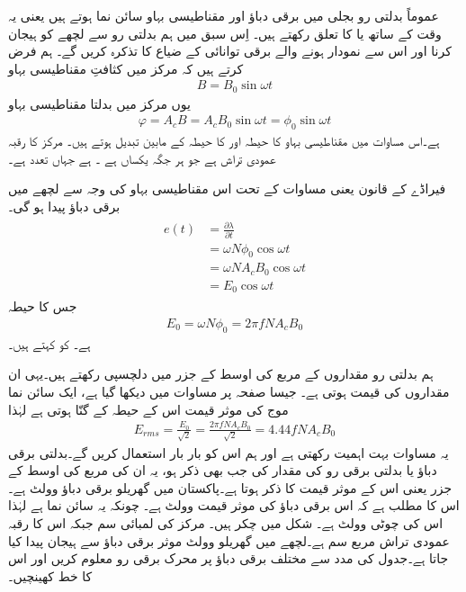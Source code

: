 عموماً بدلتی رو بجلی میں برقی دباؤ اور مقناطیسی بہاو سائن نما ہوتے ہیں یعنی یہ وقت کے ساتھ  یا  کا تعلق رکھتے ہیں۔ اِس سبق میں ہم بدلتی رو سے لچھے کو ہیجان کرنا اور اس سے نمودار ہونے والے برقی توانائی  کے ضیاع  کا تذکرہ  کریں گے۔ ہم فرض کرتے ہیں کہ مرکز میں کثافتِ مقناطیسی بہاو 
\begin{align}
B=B_0 \sin \omega t
\end{align}
یوں مرکز میں بدلتا مقناطیسی بہاو 
\begin{align}
\varphi=A_c B=A_c B_0 \sin \omega t=\phi_0 \sin \omega t
\end{align}
ہے۔اس مساوات میں مقناطیسی بہاو کا حیطہ   اور  کا حیطہ  کے مابین تبدیل ہوتے ہیں۔ مرکز کا رقبہ عمودی تراش ہے جو ہر جگہ یکساں ہے ۔ ہے جہاں  تعدد ہے۔

فیراڈے کے قانون یعنی مساوات   کے تحت اس مقناطیسی بہاو کی وجہ سے لچھے میں  برقی دباؤ  پیدا ہو گی۔
\begin{gather}
\begin{aligned}
e(t)&=\frac{\partial \lambda}{\partial t}\\
&=\omega N \phi_0 \cos \omega t \\
&=\omega N A_c B_0 \cos \omega t\\
&=E_0 \cos \omega t
\end{aligned}
\end{gather}
جس کا حیطہ
\begin{align}
E_0=\omega N \phi_0=2 \pi f N A_c B_0
\end{align}
ہے۔ کو  کہتے ہیں۔ 

ہم بدلتی رو مقداروں کے مربع کی اوسط کے جزر  میں دلچسپی رکھتے ہیں۔یہی ان مقداروں کی  قیمت ہوتی ہے۔ جیسا صفحہ  پر مساوات   میں دیکھا گیا ہے، ایک سائن نما  موج کی موثر قیمت اس کے حیطہ کے   گنّا ہوتی ہے لہٰذا 
\begin{align}\label{مساوات_مقناطیسی_دور_پیدا_دباؤ_موثر_قیمت}
E_{rms}=\frac{E_0}{\sqrt{2}}=\frac{2 \pi f N A_c B_0}{\sqrt{2}}=4.44 f N A_c B_0
\end{align}
یہ مساوات بہت اہمیت رکھتی ہے اور ہم اس کو بار بار استعمال کریں گے۔بدلتی برقی دباؤ یا بدلتی برقی رو کی مقدار کی جب بھی ذکر ہو، یہ ان کی مربع کی اوسط کے جزر  یعنی اس کے موثر قیمت  کا ذکر ہوتا ہے۔پاکستان میں گھریلو برقی دباؤ  وولٹ ہے۔اس کا مطلب ہے کہ اس برقی دباؤ کی موثر قیمت  وولٹ ہے۔ چونکہ یہ سائن نما ہے لہٰذا اس کی چوٹی  وولٹ ہے۔
%
شکل  میں  چکر ہیں۔ مرکز کی لمبائی  سم جبکہ اس کا رقبہ عمودی تراش  مربع سم ہے۔لچھے  میں گھریلو  وولٹ موثر برقی دباؤ سے ہیجان  پیدا کیا جاتا ہے۔جدول  کی مدد سے مختلف برقی دباؤ پر محرک برقی رو معلوم کریں اور اس کا خط کھینچیں۔

